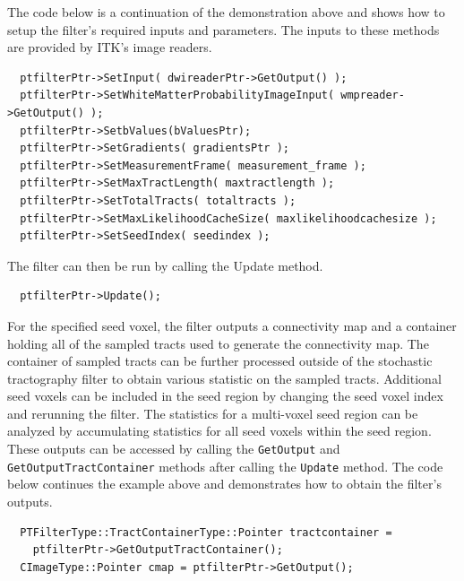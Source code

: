 \documentclass{InsightArticle}
\begin{document}
The code below is a continuation of the demonstration above and shows how to setup the filter's required inputs and parameters.  The inputs to these methods are provided by ITK's image readers.
\begin{verbatim}
  ptfilterPtr->SetInput( dwireaderPtr->GetOutput() );
  ptfilterPtr->SetWhiteMatterProbabilityImageInput( wmpreader->GetOutput() );
  ptfilterPtr->SetbValues(bValuesPtr);
  ptfilterPtr->SetGradients( gradientsPtr );
  ptfilterPtr->SetMeasurementFrame( measurement_frame );
  ptfilterPtr->SetMaxTractLength( maxtractlength );
  ptfilterPtr->SetTotalTracts( totaltracts );
  ptfilterPtr->SetMaxLikelihoodCacheSize( maxlikelihoodcachesize );
  ptfilterPtr->SetSeedIndex( seedindex );
\end{verbatim}

The filter can then be run by calling the Update method.
\begin{verbatim}
  ptfilterPtr->Update();
\end{verbatim}

For the specified seed voxel, the filter outputs a connectivity map and a container holding all of the sampled tracts used to generate the connectivity map.  The container of sampled tracts can be further processed outside of the stochastic tractography filter to obtain various statistic on the sampled tracts.  Additional seed voxels can be included in the seed region by changing the seed voxel index and rerunning the filter.  The statistics for a multi-voxel seed region can be analyzed by accumulating statistics for all seed voxels within the seed region.  These outputs can be accessed by calling the  \texttt{GetOutput} and  \texttt{GetOutputTractContainer} methods after calling the  \texttt{Update} method.  The code below continues the example above and demonstrates how to obtain the filter's outputs.
\begin{verbatim}
  PTFilterType::TractContainerType::Pointer tractcontainer = 
    ptfilterPtr->GetOutputTractContainer();
  CImageType::Pointer cmap = ptfilterPtr->GetOutput();
\end{verbatim}


%
%


%
%



\end{document}
